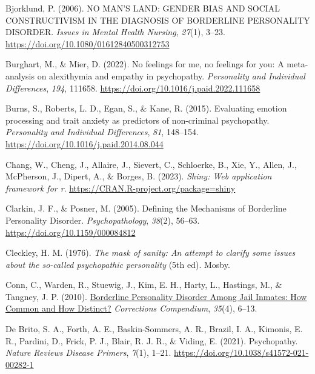 \documentclass[
  man,floatsintext]{apa7}
\newlength{\cslhangindent}
\newlength{\cslentryspacingunit} %
\newenvironment{CSLReferences}[2] %
 {%
  \setlength{\parindent}{0pt}
  \ifodd #1
  \let\oldpar\par
  \def\par{\hangindent=\cslhangindent\oldpar}
  \fi
  \setlength{\parskip}{#2\cslentryspacingunit}
 }%
 {}
\begin{document}
\begin{CSLReferences}{1}{0}
\leavevmode{}%
Bjorklund, P. (2006). {NO MAN}'{S LAND}: {GENDER BIAS AND SOCIAL CONSTRUCTIVISM IN THE DIAGNOSIS OF BORDERLINE PERSONALITY DISORDER}. \emph{Issues in Mental Health Nursing}, \emph{27}(1), 3--23. \url{https://doi.org/10.1080/01612840500312753}

\leavevmode{}%
Burghart, M., \& Mier, D. (2022). No feelings for me, no feelings for you: {A} meta-analysis on alexithymia and empathy in psychopathy. \emph{Personality and Individual Differences}, \emph{194}, 111658. \url{https://doi.org/10.1016/j.paid.2022.111658}

\leavevmode{}%
Burns, S., Roberts, L. D., Egan, S., \& Kane, R. (2015). Evaluating emotion processing and trait anxiety as predictors of non-criminal psychopathy. \emph{Personality and Individual Differences}, \emph{81}, 148--154. \url{https://doi.org/10.1016/j.paid.2014.08.044}

\leavevmode{}%
Chang, W., Cheng, J., Allaire, J., Sievert, C., Schloerke, B., Xie, Y., Allen, J., McPherson, J., Dipert, A., \& Borges, B. (2023). \emph{Shiny: Web application framework for r}. \url{https://CRAN.R-project.org/package=shiny}

\leavevmode{}%
Clarkin, J. F., \& Posner, M. (2005). Defining the {Mechanisms} of {Borderline Personality Disorder}. \emph{Psychopathology}, \emph{38}(2), 56--63. \url{https://doi.org/10.1159/000084812}

\leavevmode{}%
Cleckley, H. M. (1976). \emph{The mask of sanity: An attempt to clarify some issues about the so-called psychopathic personality} (5th ed). {Mosby}.

\leavevmode{}%
Conn, C., Warden, R., Stuewig, J., Kim, E. H., Harty, L., Hastings, M., \& Tangney, J. P. (2010). \href{https://www.ncbi.nlm.nih.gov/pmc/articles/PMC4825675}{Borderline {Personality Disorder Among Jail Inmates}: {How Common} and {How Distinct}?} \emph{Corrections Compendium}, \emph{35}(4), 6--13.

\leavevmode{}%
De Brito, S. A., Forth, A. E., Baskin-Sommers, A. R., Brazil, I. A., Kimonis, E. R., Pardini, D., Frick, P. J., Blair, R. J. R., \& Viding, E. (2021). Psychopathy. \emph{Nature Reviews Disease Primers}, \emph{7}(1), 1--21. \url{https://doi.org/10.1038/s41572-021-00282-1}


\end{CSLReferences}
\end{document}
